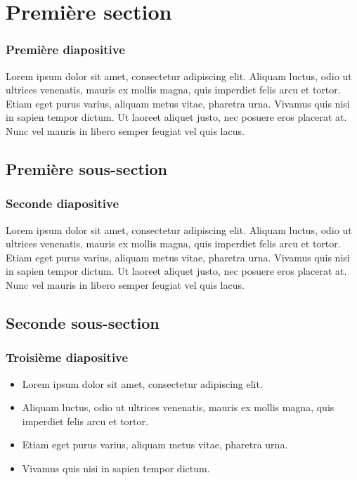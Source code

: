 \documentclass{beamer}
\begin{document}
\section{Première section}
\begin{frame}
\frametitle{Première diapositive}

Lorem ipsum dolor sit amet, consectetur adipiscing elit. Aliquam luctus, odio ut ultrices venenatis, mauris ex mollis magna, quis imperdiet felis arcu et tortor. \pause Etiam eget purus varius, aliquam metus vitae, pharetra urna. Vivamus quis nisi in sapien tempor dictum. Ut laoreet aliquet justo, nec posuere eros placerat at. Nunc vel mauris in libero semper feugiat vel quis lacus.

\end{frame}

\subsection{Première sous-section}
\begin{frame}
\frametitle{Seconde diapositive}

Lorem ipsum dolor sit amet, consectetur adipiscing elit. Aliquam luctus, odio ut ultrices venenatis, mauris ex mollis magna, quis imperdiet felis arcu et tortor. Etiam eget purus varius, aliquam metus vitae, pharetra urna. Vivamus quis nisi in sapien tempor dictum. Ut laoreet aliquet justo, nec posuere eros placerat at. Nunc vel mauris in libero semper feugiat vel quis lacus.

\end{frame}

\subsection{Seconde sous-section}
\begin{frame}
\frametitle{Troisième diapositive}

\begin{itemize}
    \item<1-3> Lorem ipsum dolor sit amet, consectetur adipiscing elit.
    \item<2> Aliquam luctus, odio ut ultrices venenatis, mauris ex mollis magna, quis imperdiet felis arcu et tortor.
    \item<1> Etiam eget purus varius, aliquam metus vitae, pharetra urna.
    \item<3> Vivamus quis nisi in sapien tempor dictum.
\end{itemize}
\end{frame}
\end{document}
